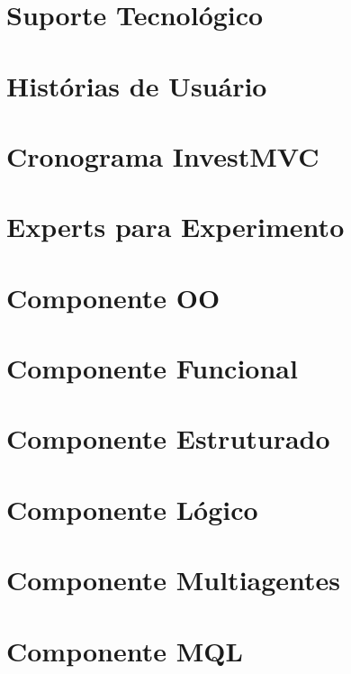 \begin{apendicesenv}

\partapendices

\chapter{Suporte Tecnológico}


\chapter{Histórias de Usuário}


\chapter{Cronograma InvestMVC}


\chapter{Experts para Experimento}


\chapter{Componente OO}



\chapter{Componente Funcional}



\chapter{Componente Estruturado}


\chapter{Componente Lógico}



\chapter{Componente Multiagentes}


\chapter{Componente MQL}

\end{apendicesenv}